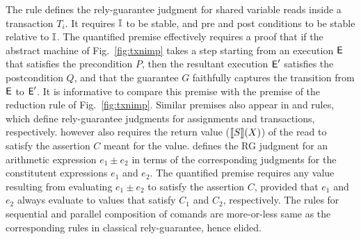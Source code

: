 The rule  defines the rely-guarantee judgment for
shared variable reads inside a transaction $T_i$. It requires $\mathbb{I}$ to
be stable, and pre and post conditions to be stable relative to $\mathbb{I}$.
The quantified premise effectively requires a proof that if the
abstract machine of Fig.~\ref{fig:txnimp} takes a step starting from
an execution $\textsf{E}$ that satisfies the precondition $P$, then the
resultant execution $\textsf{E}'$ satisfies the postcondition $Q$, and that
the guarantee $G$ faithfully captures the transition from $\textsf{E}$ to
$\textsf{E}'$. It is informative to compare this premise with the premise of
the  reduction rule of Fig.~\ref{fig:txnimp}. Similar
premises also appear in  and 
rules, which define rely-guarantee judgments for assignments and
transactions, respectively.  however also requires
the return value ($\llbracket S \rrbracket(X)$) of the read to satisfy the
assertion $C$ meant for the value.  defines the
RG judgment for an arithmetic expression $e_1\pm e_2$ in terms of the
corresponding judgments for the constitutent expressions $e_1$ and
$e_2$. The quantified premise requires any value resulting from
evaluating $e_1 \pm e_2$ to satisfy the assertion $C$, provided that
$e_1$ and $e_2$ always evaluate to values that satisfy $C_1$ and
$C_2$, respectively. The rules for sequential and parallel composition
of comands are more-or-less same as the corresponding rules in
classical rely-guarantee, hence elided.



